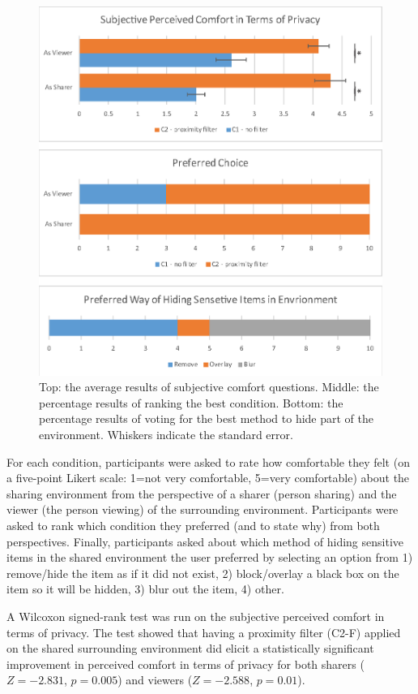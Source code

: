 \begin{figure}[H]
  \centering
  \includegraphics[width=.7\linewidth]{images/ismar18/images-04.eps}
  \caption{Top: the average results of subjective comfort questions. Middle: the percentage results of ranking the best condition. Bottom: the percentage results of voting for the best method to hide part of the environment. Whiskers indicate the standard error.}
  \label{fig:environment:results}
\end{figure}


For each condition, participants were asked to rate how comfortable they felt (on a five-point Likert scale: 1=not very comfortable, 5=very comfortable) about the sharing environment from the perspective of a sharer (person sharing) and the viewer (the person viewing) of the surrounding environment. Participants were asked to rank which condition they preferred (and to state why) from both perspectives. Finally, participants asked about which method of hiding sensitive items in the shared environment the user preferred by selecting an option from 1) remove/hide the item as if it did not exist, 2) block/overlay a black box on the item so it will be hidden, 3) blur out the item, 4) other. 

A Wilcoxon signed-rank test was run on the subjective perceived comfort in terms of privacy. The test showed that having a proximity filter (C2-F) applied on the shared surrounding environment did elicit a statistically significant improvement in perceived comfort in terms of privacy for both sharers ($Z=-2.831$, $p=0.005$) and viewers ($Z=-2.588$, $p=0.01$). 

